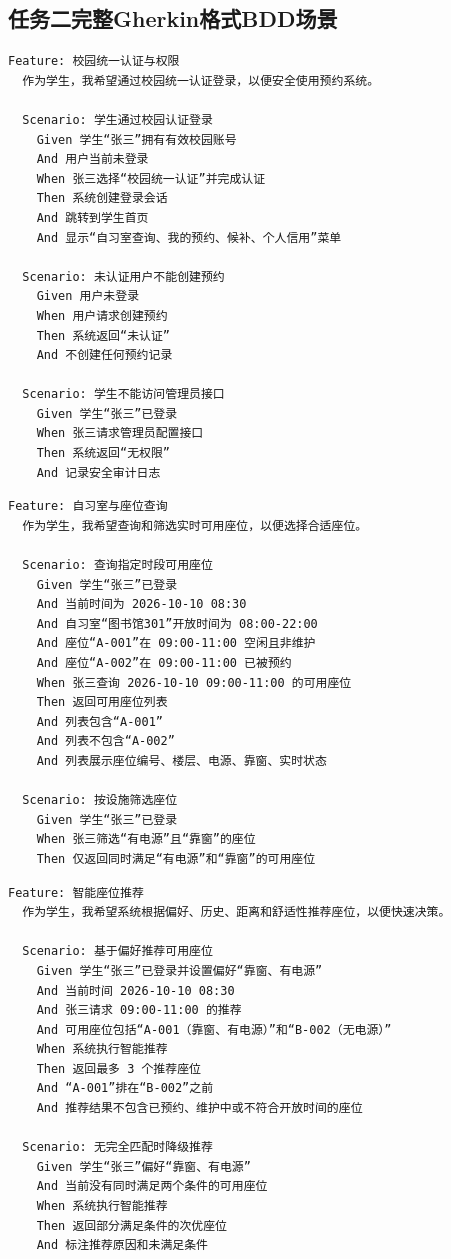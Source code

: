 \documentclass[11pt,a4paper]{article}
\begin{document}
\subsection{任务二完整Gherkin格式BDD场景}\label{app:llm-bdd}

\begin{framed}
\begin{verbatim}
Feature: 校园统一认证与权限
  作为学生，我希望通过校园统一认证登录，以便安全使用预约系统。

  Scenario: 学生通过校园认证登录
    Given 学生“张三”拥有有效校园账号
    And 用户当前未登录
    When 张三选择“校园统一认证”并完成认证
    Then 系统创建登录会话
    And 跳转到学生首页
    And 显示“自习室查询、我的预约、候补、个人信用”菜单

  Scenario: 未认证用户不能创建预约
    Given 用户未登录
    When 用户请求创建预约
    Then 系统返回“未认证”
    And 不创建任何预约记录

  Scenario: 学生不能访问管理员接口
    Given 学生“张三”已登录
    When 张三请求管理员配置接口
    Then 系统返回“无权限”
    And 记录安全审计日志
\end{verbatim}
\end{framed}

\begin{framed}
\begin{verbatim}
Feature: 自习室与座位查询
  作为学生，我希望查询和筛选实时可用座位，以便选择合适座位。

  Scenario: 查询指定时段可用座位
    Given 学生“张三”已登录
    And 当前时间为 2026-10-10 08:30
    And 自习室“图书馆301”开放时间为 08:00-22:00
    And 座位“A-001”在 09:00-11:00 空闲且非维护
    And 座位“A-002”在 09:00-11:00 已被预约
    When 张三查询 2026-10-10 09:00-11:00 的可用座位
    Then 返回可用座位列表
    And 列表包含“A-001”
    And 列表不包含“A-002”
    And 列表展示座位编号、楼层、电源、靠窗、实时状态

  Scenario: 按设施筛选座位
    Given 学生“张三”已登录
    When 张三筛选“有电源”且“靠窗”的座位
    Then 仅返回同时满足“有电源”和“靠窗”的可用座位
\end{verbatim}
\end{framed}

\begin{framed}
\begin{verbatim}
Feature: 智能座位推荐
  作为学生，我希望系统根据偏好、历史、距离和舒适性推荐座位，以便快速决策。

  Scenario: 基于偏好推荐可用座位
    Given 学生“张三”已登录并设置偏好“靠窗、有电源”
    And 当前时间 2026-10-10 08:30
    And 张三请求 09:00-11:00 的推荐
    And 可用座位包括“A-001（靠窗、有电源）”和“B-002（无电源）”
    When 系统执行智能推荐
    Then 返回最多 3 个推荐座位
    And “A-001”排在“B-002”之前
    And 推荐结果不包含已预约、维护中或不符合开放时间的座位

  Scenario: 无完全匹配时降级推荐
    Given 学生“张三”偏好“靠窗、有电源”
    And 当前没有同时满足两个条件的可用座位
    When 系统执行智能推荐
    Then 返回部分满足条件的次优座位
    And 标注推荐原因和未满足条件
\end{verbatim}
\end{framed}
\end{document}
